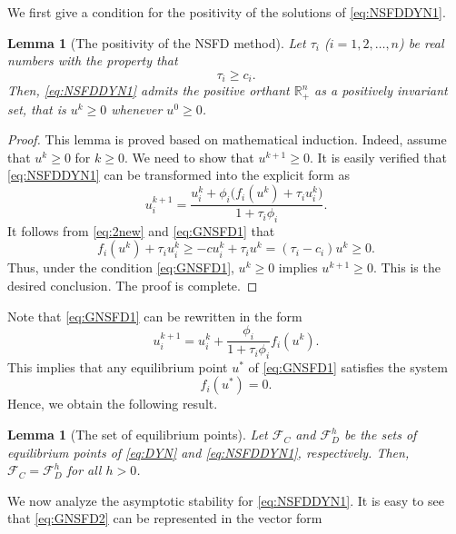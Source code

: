 \documentclass[12pt]{article}
\newtheorem{lemma}[theorem]{Lemma}
\theoremstyle{definition}
\theoremstyle{remark}
\numberwithin{equation}{section}
\begin{document}
We first give a condition for the positivity of the solutions of \eqref{eq:NSFDDYN1}.
\begin{lemma}[The positivity of the NSFD method]\label{Lemma1P}
Let $\tau_i$ ($i = 1, 2, \ldots, n$) be real numbers with the property that
\begin{equation}\label{eq:GNSFD}
\tau_i \geq c_i.
\end{equation}
Then, \eqref{eq:NSFDDYN1} admits the positive orthant $\mathbb{R}_+^n$ as a positively invariant set, that is $u^k \geq 0$ whenever $u^0 \geq 0$.
\end{lemma}
\begin{proof}
This lemma is proved based on mathematical induction. Indeed, assume that $u^k \geq 0$ for $k \geq 0$. We need to show that $u^{k + 1} \geq 0$. It is easily verified that \eqref{eq:NSFDDYN1} can be transformed into the explicit form as
\begin{equation}\label{eq:GNSFD1}
u_i^{k + 1} = \dfrac{u^k_i + \phi_i\big(f_i(u^k) + \tau_iu_i^k\big)}{1 + \tau_i\phi_i}.
\end{equation}
It follows from \eqref{eq:2new} and \eqref{eq:GNSFD1} that
\begin{equation*}
f_i(u^k) + \tau_iu_i^k \geq -cu_i^k + \tau_iu^k = (\tau_i - c_i)u^k \geq 0.
\end{equation*}
Thus, under the condition \eqref{eq:GNSFD1}, $u^k \geq 0$ implies $u^{k + 1} \geq 0$. This is the desired conclusion. The proof is complete.
\end{proof}
Note that \eqref{eq:GNSFD1} can be rewritten in the form
\begin{equation}\label{eq:GNSFD2}
u_i^{k + 1} = u_i^k + \dfrac{\phi_i}{1 + \tau_i\phi_i}f_i(u^k).
\end{equation}
This implies that any equilibrium point $u^*$ of \eqref{eq:GNSFD1} satisfies the system
\begin{equation*}
f_i(u^*) = 0.
\end{equation*}
Hence, we obtain the following result.
\begin{lemma}[The set of equilibrium points]\label{Lemma2}
Let $\mathcal{F}_C$ and $\mathcal{F}_D^h$ be the sets of equilibrium points of \eqref{eq:DYN} and \eqref{eq:NSFDDYN1}, respectively. Then, $\mathcal{F}_C = \mathcal{F}_D^h$ for all $h > 0$.
\end{lemma}
We now analyze the asymptotic stability for \eqref{eq:NSFDDYN1}. It is easy to see that \eqref{eq:GNSFD2} can be represented in the vector form
\end{document}
